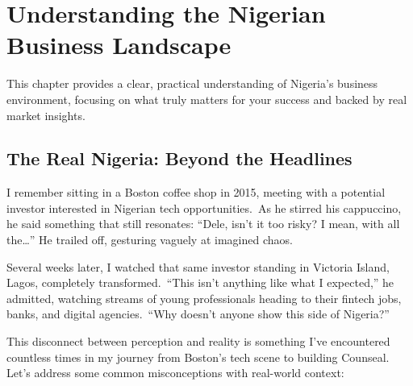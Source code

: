 
\chapter{Understanding the Nigerian Business Landscape}\label{ch:understanding-the-nigerian-business-landscape}

\begin{importantbox}
This chapter provides a clear, practical understanding of Nigeria's business environment, focusing on what truly matters for your success and backed by real market insights.
\end{importantbox}

\section{The Real Nigeria: Beyond the Headlines}\label{sec:the-real-nigeria:-beyond-the-headlines}

I remember sitting in a Boston coffee shop in 2015, meeting with a potential investor interested in Nigerian tech opportunities.\ As he stirred his cappuccino, he said something that still resonates: ``Dele, isn't it too risky?
I mean, with all the\ldots'' He trailed off, gesturing vaguely at imagined chaos.

Several weeks later, I watched that same investor standing in Victoria Island, Lagos, completely transformed.\ ``This isn't anything like what I expected,'' he admitted, watching streams of young professionals heading to their fintech jobs, banks, and digital agencies.\ ``Why doesn't anyone show this side of Nigeria?''

This disconnect between perception and reality is something I've encountered countless times in my journey from Boston's tech scene to building Counseal.
Let's address some common misconceptions with real-world context:

